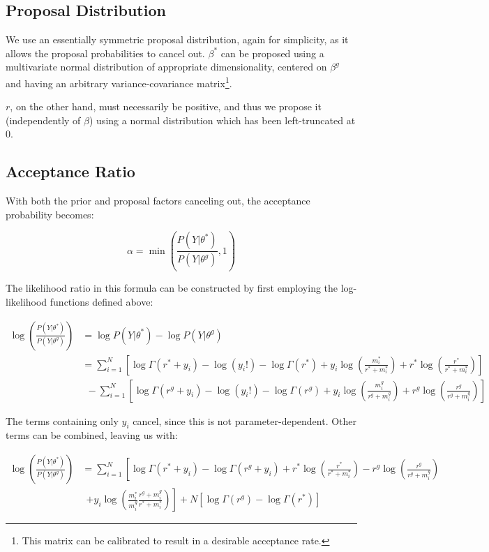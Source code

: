 \documentclass[12pt]{article}
\begin{document}
	\subsection{Proposal Distribution}
	We use an essentially symmetric proposal distribution, again for simplicity, as it allows the proposal probabilities to cancel out. $\beta^*$ can be proposed using a multivariate normal distribution of appropriate dimensionality, centered on $\beta^g$ and having an arbitrary variance-covariance matrix\footnote{This matrix can be calibrated to result in a desirable acceptance rate.}.
	
	$r$, on the other hand, must necessarily be positive, and thus we propose it (independently of $\beta$) using a normal distribution which has been left-truncated at 0.
	
	\subsection{Acceptance Ratio}
	With both the prior and proposal factors canceling out, the acceptance probability becomes:
	
	\begin{equation}
		\alpha = \min\left( \frac{P(Y|\theta^*)}{P(Y|\theta^g)},1\right)
	\end{equation}
	
	The likelihood ratio in this formula can be constructed by first employing the log-likelihood functions defined above:
	
	\begin{align*}
	\log\left( \frac{P(Y|\theta^*)}{P(Y|\theta^g)} \right) &= \log P(Y|\theta^*) - \log P(Y|\theta^g)\\
	&= \sum_{i = 1}^{N} \left[\log \Gamma(r^* + y_i) - \log(y_i!) - \log \Gamma(r^*) + y_i \log\left(\frac{m_i^*}{r^* + m_i^*}\right) + r^* \log\left(\frac{r^*}{r^* + m_i^*}\right)\right] \\&~~- \sum_{i = 1}^{N} \left[\log \Gamma(r^g + y_i) - \log(y_i!) - \log \Gamma(r^g) + y_i \log\left(\frac{m_i^g}{r^g + m_i^g}\right) + r^g \log(\frac{r^g}{r^g + m_i^g})\right]
	\end{align*}
	
	The terms containing only $y_i$ cancel, since this is not parameter-dependent. Other terms can be combined, leaving us with:
	
	\begin{align*}
	\log\left( \frac{P(Y|\theta^*)}{P(Y|\theta^g)} \right) &= \sum_{i = 1}^{N} \left[\log\Gamma(r^* + y_i) - \log\Gamma(r^g + y_i) + r^* \log\left(\frac{r^*}{r^* + m_i^*}\right) - r^g \log\left(\frac{r^g}{r^g + m_i^g}\right)\right.\\&~~ \left.+ y_i\log\left(\frac{m_i^*}{m_i^g}\frac{r^g + m_i^g}{r^* + m_i^*}\right)\right] + N\left[\log\Gamma(r^g) - \log\Gamma(r^*)\right]
	\end{align*}
	
\end{document}
